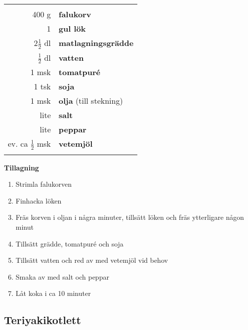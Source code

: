 \begin{table}[H]
	\begin{tabular}{rl}
	\hline
	&\\
		400 g & \textbf{falukorv}\\
		1 & \textbf{gul lök}\\
		2$\frac{1}{2}$ dl & \textbf{matlagningsgrädde}\\
		$\frac{1}{2}$ dl & \textbf{vatten}\\
		1 msk & \textbf{tomatpuré}\\
		1 tsk & \textbf{soja}\\
		1 msk & \textbf{olja} (till stekning)\\
		lite & \textbf{salt}\\
		lite & \textbf{peppar}\\
		ev. ca $\frac{1}{2}$ msk & \textbf{vetemjöl}\\
	&\\
	\hline
	\end{tabular}
\end{table}


\begin{multicols*}{2}

\noindent \textbf{Tillagning}
\begin{enumerate}
	\itemsep0cm
	\item Strimla falukorven
	\item Finhacka löken
	\item Fräs korven i oljan i några \mbox{minuter}, tillsätt löken och fräs ytterligare någon minut
	\item Tillsätt grädde, tomatpuré och soja
	\item Tillsätt vatten och red av med vetemjöl vid behov
	\item Smaka av med salt och peppar
	\item Låt koka i ca 10 minuter
\end{enumerate}

\end{multicols*}

\clearpage


\subsection{Teriyakikotlett}

